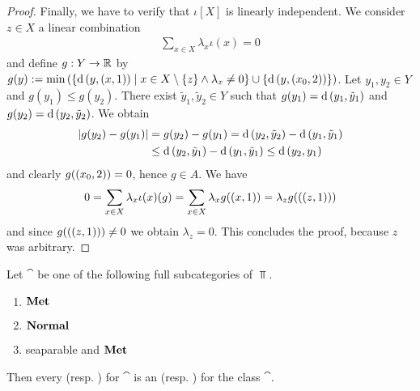 \begin{proof}
	
	Finally, we have to verify that $\iota[X]$ is linearly independent. We consider $z \in X$ a linear combination 
	\begin{align*}
		\sum_{x \in X} \lambda_x \iota(x) = 0
	\end{align*}
	and define $g: Y \to \mathbb R$ by $g(y) := \min{\left ( {\left \{ \operatorname{d}{\left ( y, (x, 1) \right )} \mid x \in X \setminus \{z\} \land \lambda_x \neq 0 \right \}} \cup {\left \{ \operatorname{d}{\left ( y, {\left ( x_0, 2 \right )} \right )} \right \}} \right )}$. Let $y_1, y_2 \in Y$ and \Wlog $g(y_1) \leq g(y_2)$. There exist $\tilde{y}_1, \tilde{y}_2 \in Y$ such that $g(y_1) = \operatorname{d}{\left ( y_1, \tilde{y}_1 \right )}$ and $g(y_2) = \operatorname{d}{\left ( y_2, \tilde{y}_2 \right )}$. We obtain
	\begin{align*}
		{\left | g(y_2) - g(y_1) \right |} &= g(y_2) - g(y_1) = \operatorname{d}{\left ( y_2, \tilde{y}_2 \right )} - \operatorname{d}{\left ( y_1, \tilde{y}_1 \right )} \\
		&\leq \operatorname{d}{\left ( y_2, \tilde{y}_1 \right )} - \operatorname{d}{\left ( y_1, \tilde{y}_1 \right )} \leq \operatorname{d}{\left ( y_2, y_1 \right )}
	\end{align*}
	and clearly $g{\left ( {\left ( x_0, 2 \right )} \right )} = 0$, hence $g \in A$. We have
	\begin{align*}
		0 = \sum_{x \in X} \lambda_x \iota(x)(g) = \sum_{x \in X} \lambda_x g{\left ( {\left ( x, 1 \right )} \right )} = \lambda_z g({\left ( {\left ( z, 1 \right )} \right )})
	\end{align*}
	and since $g({\left ( {\left ( z, 1 \right )} \right )}) \neq 0$ we obtain $\lambda_z = 0$. This concludes the proof, because $z$ was arbitrary.  
\end{proof}

\begin{theorem}\cite[p. 84]{ToR}
	Let $\cat$ be one of the following full subcategories of $\Top$.
	\begin{enumerate}
		\item $\mathbf{Met}$
		\item $\mathbf{Normal}$
		\item seaparable and $\mathbf{Met}$
	\end{enumerate}
	Then every \anr (resp. \ar) for $\cat$ is an \ane (resp. \aex) for the class $\cat$. 
\end{theorem}